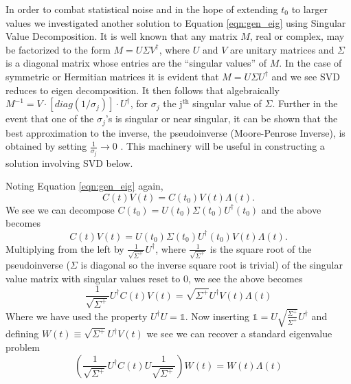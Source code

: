 \par 
In order to combat statistical noise and in the hope of extending $t_0$ to larger values we investigated another solution to Equation \ref{eqn:gen_eig} using Singular Value Decomposition.  It is well known that any matrix $M$, real or complex, may be factorized to the form $M = U\Sigma V^{\dagger}$\cite{numRecp}, where $U$ and $V$ are unitary matrices and $\Sigma$ is a diagonal matrix whose entries are the ``singular values'' of $M$. In the case of symmetric or Hermitian matrices it is evident that $M = U\Sigma U^{\dagger}$ and we see SVD reduces to eigen decomposition. It then follows that algebraically $M^{-1} = V\cdot [diag(1/\sigma_j)]\cdot U^{\dagger}$, for $\sigma_j$ the j$^{\text{th}}$ singular value of $\Sigma$.  Further in the event that one of the $\sigma_j$'s is singular or near singular, it can be shown that the best approximation to the inverse, the pseudoinverse (Moore-Penrose Inverse), is obtained by setting $\frac{1}{\sigma_j} \rightarrow 0$ \cite{numRecp}. This machinery will be useful in constructing a solution involving SVD below.
\par
Noting Equation \ref{eqn:gen_eig} again,
\begin{equation*}
C(t)V(t) = C(t_0)V(t)\Lambda(t).
\end{equation*}
We see we can decompose $C(t_0) = U(t_0)\Sigma(t_0)U^{\dagger}(t_0)$ and the above becomes
\begin{equation*}
C(t)V(t) = U(t_0)\Sigma(t_0)U^{\dagger}(t_0)V(t)\Lambda(t).
\end{equation*}
Multiplying from the left by $\frac{1}{\sqrt{\Sigma^{+}}}U^{\dagger}$, where $\frac{1}{\sqrt{\Sigma^{+}}}$ is the square root of the pseudoinverse ($\Sigma$ is diagonal so the inverse square root is trivial) of the singular value matrix with singular values reset to 0, we see the above becomes
\begin{equation*}
\frac{1}{\sqrt{\Sigma^{+}}}U^{\dagger}C(t)V(t) = \sqrt{\Sigma^{+}}U^{\dagger}V(t)\Lambda(t)
\end{equation*}
Where we have used the property $U^{\dagger}U = \mathbb{1}$.  Now inserting $\mathbb{1} = U\sqrt{\frac{\Sigma^{+}}{\Sigma^{+}}}U^{\dagger}$ and defining $W(t) \equiv \sqrt{\Sigma^{+}}U^{\dagger}V(t)$ we see we can recover a standard eigenvalue problem
\begin{equation}
\label{eqn:svd_gen_eig}
\left(\frac{1}{\sqrt{\Sigma^{+}}}U^{\dagger}C(t)U\frac{1}{\sqrt{\Sigma^{+}}}\right)W(t) =  W(t)\Lambda(t) 
\end{equation}
